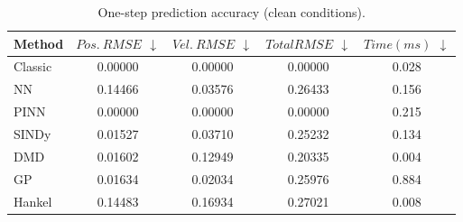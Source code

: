 \begin{table}[htbp]
\centering
\caption{One-step prediction accuracy (clean conditions).}
\label{tab:onestep}
\begin{tabular}{lcccc}
\toprule
Method & $Pos.\ RMSE$ $\downarrow$ & $Vel.\ RMSE$ $\downarrow$ & $Total RMSE$ $\downarrow$ & $Time (ms)$ $\downarrow$ \\
\midrule
Classic & 0.00000 & 0.00000 & 0.00000 & 0.028 \\
NN & 0.14466 & 0.03576 & 0.26433 & 0.156 \\
PINN & 0.00000 & 0.00000 & 0.00000 & 0.215 \\
SINDy & 0.01527 & 0.03710 & 0.25232 & 0.134 \\
DMD & 0.01602 & 0.12949 & 0.20335 & 0.004 \\
GP & 0.01634 & 0.02034 & 0.25976 & 0.884 \\
Hankel & 0.14483 & 0.16934 & 0.27021 & 0.008 \\
\bottomrule
\end{tabular}
\end{table}